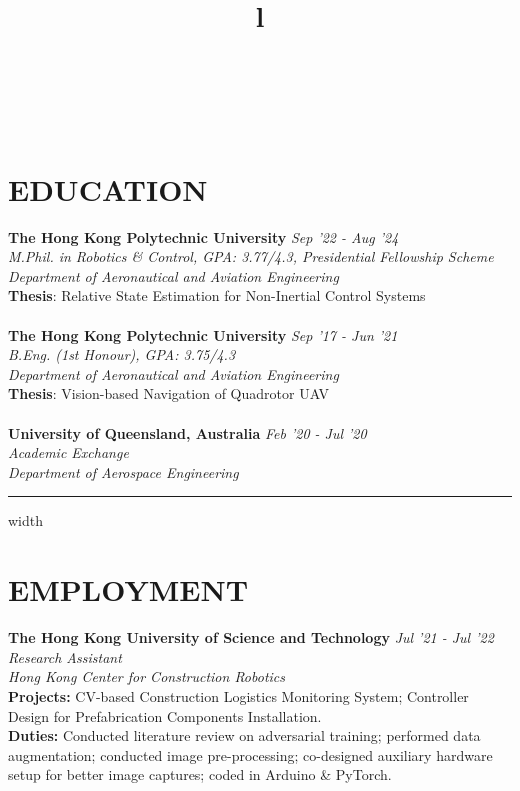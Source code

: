 \documentclass[overlapped]{res}
\begin{document}
\begin{resume}

\begin{format}
  \title{l}\\
  \body\\
\end{format}

\section{EDUCATION}
\textbf{The Hong Kong Polytechnic University} \hfill \textit{Sep '22 - Aug '24}\\
{\sl M.Phil. in Robotics \& Control, GPA: 3.77/4.3, Presidential Fellowship Scheme \\ 
Department of Aeronautical and Aviation Engineering}\\ 
\textbf{Thesis}: Relative State Estimation for Non-Inertial Control Systems
\\ \\ 
\textbf{The Hong Kong Polytechnic University} \hfill \textit{Sep '17 - Jun '21}\\
{\sl B.Eng. (1st Honour), GPA: 3.75/4.3\\ 
Department of Aeronautical and Aviation Engineering}\\ 
\textbf{Thesis}: Vision-based Navigation of Quadrotor UAV
\\ \\ 
\textbf{University of Queensland, Australia} \hfill \textit{Feb '20 - Jul '20}\\
{\sl Academic Exchange \\ 
Department of Aerospace Engineering}
\par\noindent\hrule width \linewidth %

\section{EMPLOYMENT}
\textbf{The Hong Kong University of Science and Technology} \hfill \textit{Jul '21 - Jul '22}\\
{\sl Research Assistant\\
Hong Kong Center for Construction Robotics}\\ 
\textbf{Projects:} CV-based Construction Logistics Monitoring System; Controller Design for Prefabrication Components Installation.\\
\textbf{Duties:} Conducted literature review on adversarial training; performed data augmentation; conducted image pre-processing; co-designed auxiliary hardware setup for better image captures; coded in Arduino \& PyTorch.


\end{resume}
\end{document}
